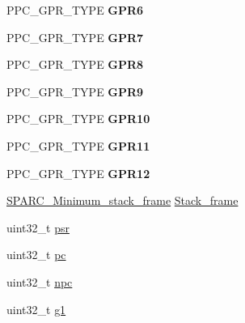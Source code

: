 \begin{DoxyCompactItemize}
\item 
\mbox{\label{structCPU__Interrupt__frame_a82461f5ba2d15e0f5a20769e16dffff6}} 
P\+P\+C\+\_\+\+G\+P\+R\+\_\+\+T\+Y\+PE {\bfseries G\+P\+R6}
\item 
\mbox{\label{structCPU__Interrupt__frame_ae79c7bd273cf99e698c33494a4318477}} 
P\+P\+C\+\_\+\+G\+P\+R\+\_\+\+T\+Y\+PE {\bfseries G\+P\+R7}
\item 
\mbox{\label{structCPU__Interrupt__frame_a032ca700c19ea02db838119bc1b06d1b}} 
P\+P\+C\+\_\+\+G\+P\+R\+\_\+\+T\+Y\+PE {\bfseries G\+P\+R8}
\item 
\mbox{\label{structCPU__Interrupt__frame_a096745a819081a22dc9bb6cdd9c98db0}} 
P\+P\+C\+\_\+\+G\+P\+R\+\_\+\+T\+Y\+PE {\bfseries G\+P\+R9}
\item 
\mbox{\label{structCPU__Interrupt__frame_a1035ac88e401b4aa2f1f9444e1d21023}} 
P\+P\+C\+\_\+\+G\+P\+R\+\_\+\+T\+Y\+PE {\bfseries G\+P\+R10}
\item 
\mbox{\label{structCPU__Interrupt__frame_a2051f83a980304e8e67a3c793d92dd54}} 
P\+P\+C\+\_\+\+G\+P\+R\+\_\+\+T\+Y\+PE {\bfseries G\+P\+R11}
\item 
\mbox{\label{structCPU__Interrupt__frame_a48b233cb533080eca5fe521b7cd8a129}} 
P\+P\+C\+\_\+\+G\+P\+R\+\_\+\+T\+Y\+PE {\bfseries G\+P\+R12}
\item 
\mbox{\hyperlink{structSPARC__Minimum__stack__frame}{S\+P\+A\+R\+C\+\_\+\+Minimum\+\_\+stack\+\_\+frame}} \mbox{\hyperlink{structCPU__Interrupt__frame_a203c45865a21d7b0ae9a225fd0890917}{Stack\+\_\+frame}}
\item 
uint32\+\_\+t \mbox{\hyperlink{structCPU__Interrupt__frame_ac41dde5fc64c9a261d2aae148df2a85f}{psr}}
\item 
uint32\+\_\+t \mbox{\hyperlink{structCPU__Interrupt__frame_a9df5168323444abe337f730c807cec83}{pc}}
\item 
uint32\+\_\+t \mbox{\hyperlink{structCPU__Interrupt__frame_ae349a240306b6e08b59fba858a291a1a}{npc}}
\item 
uint32\+\_\+t \mbox{\hyperlink{structCPU__Interrupt__frame_a5b2c2792924d0b58df2497a4f4e37e10}{g1}}

\end{DoxyCompactItemize}
